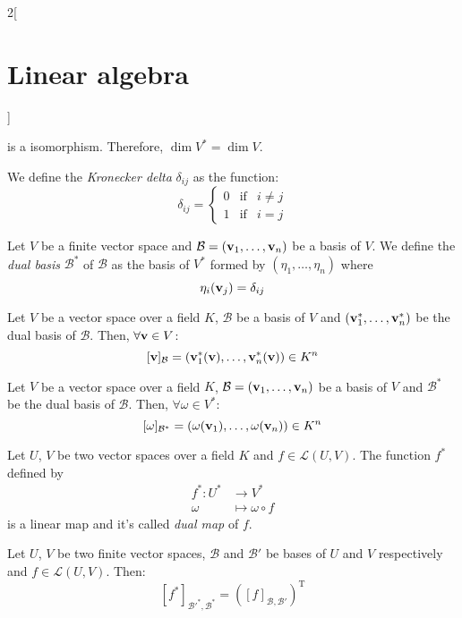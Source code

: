 \documentclass[../../../main.tex]{subfiles}
\begin{document}
\begin{multicols}{2}[\section{Linear algebra}]
\begin{prop}
    is a isomorphism. Therefore, $\dim V^*=\dim V$.
  \end{prop}
  \begin{definition}
    We define the \emph{Kronecker delta} $\delta_{ij}$ as the function: $$\delta_{ij}=\left\{
      \begin{array}{ccc}
        0 & \text{if} & i\ne j \\
        1 & \text{if} & i=j
      \end{array}
      \right.$$
  \end{definition}
  \begin{definition}
    Let $V$ be a finite vector space and $\mathcal{B}=(\boldsymbol{\mathrm{v}}_1,\ldots,\boldsymbol{\mathrm{v}}_n)$ be a basis of $V$. We define the \emph{dual basis} $\mathcal{B}^*$ of $\mathcal{B}$ as the basis of $V^*$ formed by $(\eta_1,\ldots,\eta_n)$ where $$\eta_i(\boldsymbol{\mathrm{v}}_j)=\delta_{ij}$$
  \end{definition}
  \begin{lemma}
    Let $V$ be a vector space over a field $K$, $\mathcal{B}$ be a basis of $V$ and $(\boldsymbol{\mathrm{v}}_1^*,\ldots,\boldsymbol{\mathrm{v}}_n^*)$ be the dual basis of $\mathcal{B}$. Then, $\forall \boldsymbol{\mathrm{v}}\in V$: $$[\boldsymbol{\mathrm{v}}]_\mathcal{B}=(\boldsymbol{\mathrm{v}}_1^*(\boldsymbol{\mathrm{v}}),\ldots,\boldsymbol{\mathrm{v}}_n^*(\boldsymbol{\mathrm{v}}))\in K^n$$
  \end{lemma}
  \begin{lemma}
    Let $V$ be a vector space over a field $K$, $\mathcal{B}=(\boldsymbol{\mathrm{v}}_1,\ldots,\boldsymbol{\mathrm{v}}_n)$ be a basis of $V$ and $\mathcal{B}^*$ be the dual basis of $\mathcal{B}$. Then, $\forall \omega\in V^*$: $$[\omega]_{\mathcal{B}^*}=(\omega(\boldsymbol{\mathrm{v}}_1),\ldots,\omega(\boldsymbol{\mathrm{v}}_n))\in K^n$$
  \end{lemma}
  \begin{definition}
    Let $U$, $V$ be two vector spaces over a field $K$ and $f\in \mathcal{L}(U,V)$. The function $f^*$ defined by
    \begin{align*}
      f^*:U^* & \longrightarrow V^*      \\
      \omega  & \longmapsto\omega\circ f
    \end{align*}
    is a linear map and it's called \emph{dual map} of $f$.
  \end{definition}
  \begin{theorem}
    Let $U$, $V$ be two finite vector spaces, $\mathcal{B}$ and $\mathcal{B}'$ be bases of $U$ and $V$ respectively and $f\in\mathcal{L}(U,V)$. Then: $$[f^*]_{\mathcal{B}'^*,\mathcal{B}^*}={([f]_{\mathcal{B},\mathcal{B}'})}^\mathrm{T}$$
  \end{theorem}

\end{multicols}
\end{document}
